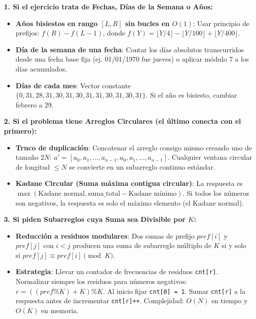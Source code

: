 \documentclass[9pt,twocolumn,a4paper]{extarticle}
\begin{document}
\textbf{1. Si el ejercicio trata de Fechas, Días de la Semana o Años:}
\begin{itemize}
    \setlength{\itemsep}{0pt}
    \item \textbf{Años bisiestos en rango $[L, R]$ sin bucles en $O(1)$}: Usar principio de prefijos: $f(R) - f(L-1)$, donde $f(Y) = \lfloor Y/4 \rfloor - \lfloor Y/100 \rfloor + \lfloor Y/400 \rfloor$.
    \item \textbf{Día de la semana de una fecha}: Contar los días absolutos transcurridos desde una fecha base fija (ej. 01/01/1970 fue jueves) o aplicar módulo 7 a los días acumulados.
    \item \textbf{Días de cada mes}: Vector constante $\{0, 31, 28, 31, 30, 31, 30, 31, 31, 30, 31, 30, 31\}$. Si el año es bisiesto, cambiar febrero a 29.
\end{itemize}

\textbf{2. Si el problema tiene Arreglos Circulares (el último conecta con el primero):}
\begin{itemize}
    \setlength{\itemsep}{0pt}
    \item \textbf{Truco de duplicación}: Concatenar el arreglo consigo mismo creando uno de tamaño $2N$: $a' = [a_0, a_1, \dots, a_{n-1}, a_0, a_1, \dots, a_{n-1}]$. Cualquier ventana circular de longitud $\le N$ se convierte en un subarreglo continuo estándar.
    \item \textbf{Kadane Circular (Suma máxima contigua circular)}: La respuesta es $\max(\text{Kadane normal}, \text{suma\_total} - \text{Kadane mínimo})$. Si todos los números son negativos, la respuesta es solo el máximo elemento (el Kadane normal).
\end{itemize}

\textbf{3. Si piden Subarreglos cuya Suma sea Divisible por $K$:}
\begin{itemize}
    \setlength{\itemsep}{0pt}
    \item \textbf{Reducción a residuos modulares}: Dos sumas de prefijo $pref[i]$ y $pref[j]$ con $i < j$ producen una suma de subarreglo múltiplo de $K$ si y solo si $pref[j] \equiv pref[i] \pmod K$.
    \item \textbf{Estrategia}: Llevar un contador de frecuencias de residuos \texttt{cnt[r]}. Normalizar siempre los residuos para números negativos: $r = ((pref \% K) + K) \% K$. Al inicio fijar \texttt{cnt[0] = 1}. Sumar \texttt{cnt[r]} a la respuesta antes de incrementar \texttt{cnt[r]++}. Complejidad: $O(N)$ en tiempo y $O(K)$ en memoria.
\end{itemize}
\end{document}

